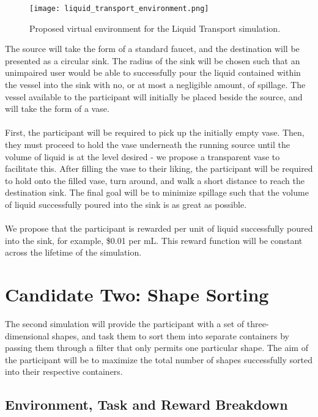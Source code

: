 \documentclass{article}
\begin{document}
\begin{figure}[H]
    \texttt{[image: liquid\_transport\_environment.png]}
    \centering
    \caption{Proposed virtual environment for the Liquid Transport simulation.}
\end{figure}

The source will take the form of a standard faucet, and the destination will be presented as a circular sink. The radius of the sink will be chosen such that an unimpaired user would be able to successfully pour the liquid contained within the vessel into the sink with no, or at most a negligible amount, of spillage. The vessel available to the participant will initially be placed beside the source, and will take the form of a vase.
\\
\\
First, the participant will be required to pick up the initially empty vase. Then, they must proceed to hold the vase underneath the running source until the volume of liquid is at the level desired - we propose a transparent vase to facilitate this. After filling the vase to their liking, the participant will be required to hold onto the filled vase, turn around, and walk a short distance to reach the destination sink. The final goal will be to minimize spillage such that the volume of liquid successfully poured into the sink is as great as possible.
\\
\\
We propose that the participant is rewarded per unit of liquid successfully poured into the sink, for example, \$0.01 per mL. This reward function will be constant across the lifetime of the simulation.

\section*{Candidate Two: Shape Sorting}

The second simulation will provide the participant with a set of three-dimensional shapes, and task them to sort them into separate containers by passing them through a filter that only permits one particular shape. The aim of the participant will be to maximize the total number of shapes successfully sorted into their respective containers.

\subsection*{Environment, Task and Reward Breakdown}
\end{document}
